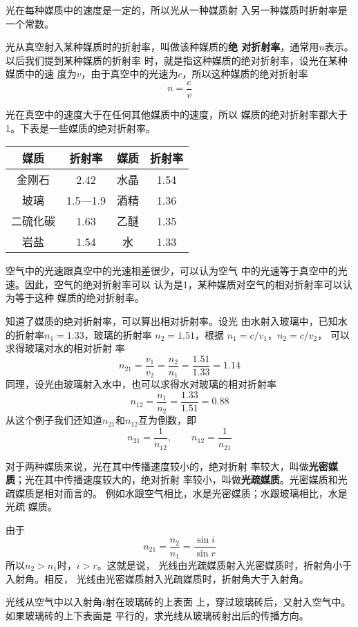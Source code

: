     光在每种媒质中的速度是一定的，所以光从一种媒质射
    入另一种媒质时折射率是一个常数。

    光从真空射入某种媒质时的折射率，叫做该种媒质的\textbf{绝
    对折射率}，通常用$n$表示。以后我们提到某种媒质的折射率
    时，就是指这种媒质的绝对折射率，设光在某种媒质中的速
    度为$v$，由于真空中的光速为$c$，所以这种媒质的绝对折射率
\[n=\frac{c}{v} \]

    光在真空中的速度大于在任何其他媒质中的速度，所以
    媒质的绝对折射率都大于1。下表是一些媒质的绝对折射率。
    \begin{center}
        \begin{tabular}{cccc}
        \hline
            媒质 & 折射率 & 媒质 & 折射率\\
        \hline
  金刚石  &  2.42 &  水晶   & 1.54\\
  玻璃   &   1.5—1.9  &  酒精  &  1.36\\
  二硫化碳  & 1.63  &  乙醚  &  1.35\\
  岩盐  &  1.54  &  水   &  1.33\\ 
        \hline
            \end{tabular}
        \end{center}

空气中的光速跟真空中的光速相差很少，可以认为空气
中的光速等于真空中的光速。因此，空气的绝对折射率可以
认为是1，某种媒质对空气的相对折射率可以认为等于这种
媒质的绝对折射率。

知道了媒质的绝对折射率，可以算出相对折射率。设光
由水射入玻璃中，已知水的折射率$n_1=1.33$，玻璃的折射率
$n_2=1.51$，根据
$n_1=c/v_1$，$n_2=c/v_2$，
可以求得玻璃对水的相对折射
率
$$n_{21}=\frac{v_1}{v_2}=\frac{n_2}{n_1}=\frac{1.51}{1.33}=1.14$$
同理，设光由玻璃射入水中，也可以求得水对玻璃的相对折射率
\[n_{12}=\frac{n_1}{n_2}=\frac{1.33}{1.51}=0.88 \]
从这个例子我们还知道$n_{21}$和$n_{12}$互为倒数，即
\[n_{21}=\frac{1}{n_{12}},\qquad n_{12}=\frac{1}{n_{21}}  \]

对于两种媒质来说，光在其中传播速度较小的，绝对折射
率较大，叫做\textbf{光密媒质}；光在其中传播速度较大的，绝对折射
率较小，叫做\textbf{光疏媒质}。光密媒质和光疏媒质是相对而言的。
例如水跟空气相比，水是光密媒质；水跟玻璃相比，水是光疏
媒质。

由于
\[n_{21}=\frac{n_2}{n_1}=\frac{\sin i}{\sin r} \]
所以$n_2>n_1$时，$i>r$。这就是说，
光线由光疏媒质射入光密媒质时，折射角小于入射角。相反，
光线由光密媒质射入光疏媒质时，折射角大于入射角。

\begin{example}
    光线从空气中以入射角$i$射在玻璃砖的上表面
    上，穿过玻璃砖后，又射入空气中。如果玻璃砖的上下表面是
    平行的，求光线从玻璃砖射出后的传播方向。
\end{example}

